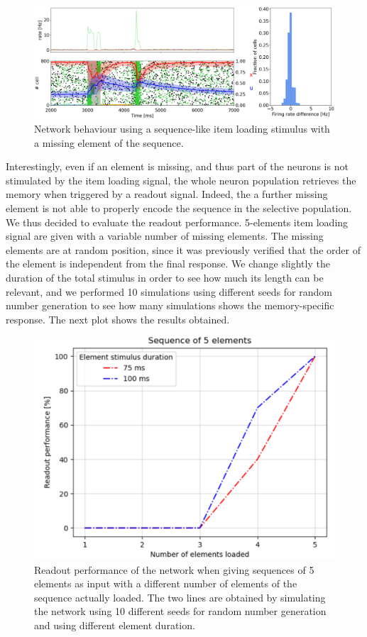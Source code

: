 \documentclass[a4paper, 12pt, twoside, openright]{book}
\begin{document}
\begin{figure}[H]
    \centering
    \includegraphics[width=\columnwidth]{figures/missing_element.png}
    \caption{Network behaviour using a sequence-like item loading stimulus with a missing element of the sequence.}
    \label{fig:missing_element}
\end{figure}


Interestingly, even if an element is missing, and thus part of the neurons is not stimulated by the item loading signal, the whole neuron population retrieves the memory when triggered by a readout signal. Indeed, the a further missing element is not able to properly encode the sequence in the selective population. We thus decided to evaluate the readout performance. 5-elements item loading signal are given with a variable number of missing elements. The missing elements are at random position, since it was previously verified that the order of the element is independent from the final response. We change slightly the duration of the total stimulus in order to see how much its length can be relevant, and we performed 10 simulations using different seeds for random number generation to see how many simulations shows the memory-specific response. The next plot shows the results obtained.

\begin{figure}[H]
    \centering
    \includegraphics[scale=0.2]{figures/readout_performance.png}
    \caption{Readout performance of the network when giving sequences of 5 elements as input with a different number of elements of the sequence actually loaded. The two lines are obtained by simulating the network using 10 different seeds for random number generation and using different element duration.}
    \label{fig:readout_performance}
\end{figure}
\end{document}
